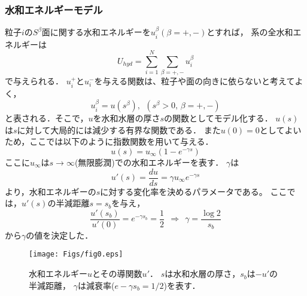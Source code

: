 \subsubsection{水和エネルギーモデル}
粒子$i$の$S^\beta$面に関する水和エネルギーを$u^\beta_i(\beta=+,-)$とすれば，
系の全水和エネルギーは
\begin{equation}
	U_{hyd}=\sum_{i=1}^N\sum_{\beta=+,-} u_i^{\beta}
	\label{eqn:}
\end{equation}
で与えられる．
$u^+_i$と$u^-_i$を与える関数は、粒子や面の向きに依らないと考えてよく，
\begin{equation}
	u^\beta_i= u(s^\beta), \ \ (s^\beta>0,\, \beta=+,-)
	\label{eqn:}
\end{equation}
と表される．そこで，$u$を水和水層の厚さ$s$の関数としてモデル化する．
$u(s)$は$s$に対して大局的には減少する有界な関数である．
また$u(0)=0$としてよいため，ここでは以下のように指数関数を用いて与える．
\begin{equation}
	u(s)=u_{\infty} \left(1-e^{-\gamma s} \right)
	\label{eqn:u_s}
\end{equation}
ここに$u_{\infty}$は$s\rightarrow \infty$(無限膨潤)での水和エネルギーを表す．
$\gamma$は
\begin{equation}
	u'(s)=\frac{du}{ds}=\gamma u_{\infty} e^{-\gamma s}
	\label{eqn:ud_s}
\end{equation}
より，水和エネルギーの$s$に対する変化率を決めるパラメータである。
ここでは，$u'(s)$の半減距離$s=s_b$を与え，
\begin{equation}
	\frac{u'\left(s_b\right)}{u'(0)}=e^{-\gamma s_b}=\frac{1}{2} 
	\ \ \Rightarrow \ \
	\gamma=\frac{\log 2}{s_b}
	\label{eqn:}
\end{equation}
から$\gamma$の値を決定した．
\begin{figure}[h]
	\begin{center}
	\texttt{[image: Figs/fig0.eps]} 
	\end{center}
	\caption{
		水和エネルギー$u$とその導関数$u'$．
		$s$は水和水層の厚さ，$s_b$は$-u'$の半減距離，
		$\gamma$は減衰率($e-\gamma s_b=1/2$)を表す．
	} 
	\label{fig:fig0}
\end{figure}
